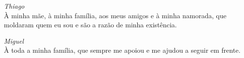 \textit{Thiago}\\
À minha mãe, à minha família, aos meus amigos e à minha namorada, que moldaram quem eu sou e são a razão de minha existência.

\vspace{1.5em}

\textit{Miguel}\\
À toda a minha família, que sempre me apoiou e me ajudou a seguir em frente.
